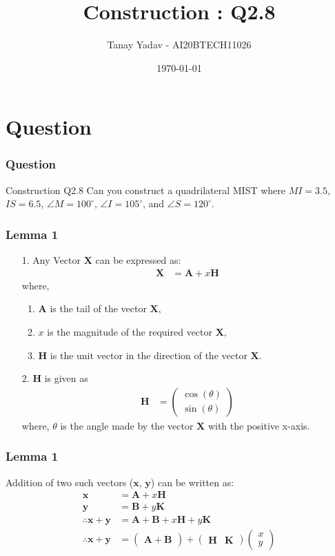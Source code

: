 \documentclass{beamer}
\title{Construction : Q2.8}
\author{Tanay Yadav - AI20BTECH11026}
\date{\today}
\theoremstyle{remark}
\renewcommand{\vec}[1]{\mathbf{#1}}
\newcommand{\myvec}[1]{\ensuremath{\begin{pmatrix}#1\end{pmatrix}}}
\begin{document}
\begin{frame}
\titlepage
\end{frame}
\section{Question}
\begin{frame}
    \frametitle{Question}
    \begin{block}{Construction Q2.8}
        Can you construct a quadrilateral MIST where $MI = 3.5$, $IS = 6.5$, $\angle M = 100^{\circ}$, $\angle I = 105^{\circ}$, and $\angle S = 120^{\circ}$.
    \end{block}
\end{frame}
\begin{frame}
    \frametitle{Lemma 1}
    \begin{block}{}
    \begin{enumerate}
    \item[1.]Any Vector $\vec{X}$ can be expressed as:
    \begin{align}
        \vec{X} &= \vec{A} + x\vec{H}
    \end{align}
    where,
    \begin{enumerate}
        \item $\vec{A}$ is the tail of the vector $\vec{X}$,
        \item $x$ is the magnitude of the required vector $\vec{X}$,
        \item $\vec{H}$ is the unit vector in the direction of the vector $\vec{X}$.
    \end{enumerate}
    
    \item[2.]$\vec{H}$ is given as
    \begin{align}
        \vec{H} &= \myvec{\cos(\theta)\\\sin(\theta)}
    \end{align}
    where, $\theta$ is the angle made by the vector $\vec{X}$ with the positive x-axis.
    \end{enumerate}
    \end{block}
\end{frame}
\begin{frame}
    \frametitle{Lemma 1}
    \begin{block}{}
        Addition of two such vectors ($\vec{x}$, $\vec{y}$) can be written as:
    \begin{align}
        \vec{x} &= \vec{A} + x\vec{H}\\
        \vec{y} &= \vec{B} + y\vec{K}\\
        \therefore \vec{x} + \vec{y} &= \vec{A} + \vec{B} + x\vec{H} + y\vec{K}\\
       \therefore \vec{x} + \vec{y} &= \myvec{\vec{A} + \vec{B}} + \myvec{\vec{H} & \vec{K}}\myvec{x\\y}
    \end{align}
    \end{block}
\end{frame}
\end{document}
